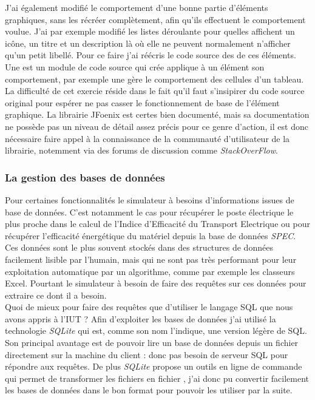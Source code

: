 J'ai également modifié le comportement d'une bonne partie d'éléments graphiques, sans les récréer complètement, afin qu'ils effectuent le comportement voulue. J'ai par exemple modifié les listes déroulante pour quelles affichent un icône, un titre et un description là où elle ne peuvent normalement n'afficher qu'un petit libellé. Pour ce faire j'ai réécris le code source des  de ces éléments. Une  est un module de code source qui crée applique à un élément son comportement, par exemple une  gère le comportement des cellules d'un tableau. La difficulté de cet exercie réside dans le fait qu'il faut s'insipirer du code source original pour espérer ne pas casser le fonctionnement de base de l'élément graphique. La librairie JFoenix est certes bien documenté, mais sa documentation ne possède pas un niveau de détail assez précis pour ce genre d'action, il est donc nécessaire faire appel à la connaissance de la communauté d'utilisateur de la librairie, notemment via des forums de discussion comme \emph{StackOverFlow}.

\subsubsection{La gestion des bases de données}
Pour certaines fonctionnalités le simulateur à besoins d'informations issues de base de données. C'est notamment le cas pour récupérer le poste électrique le plus proche dans le calcul de l'Indice d'Efficacité du Transport Electrique ou pour récupérer l'efficacité énergétique du matériel depuis la base de données \emph{SPEC}.\\
Ces données sont le plus souvent stockés dans des structures de données facilement lisible par l'humain, mais qui ne sont pas très performant pour leur exploitation automatique par un algorithme, comme par exemple les classeurs Excel. Pourtant le simulateur à besoin de faire des requêtes sur ces données pour extraire ce dont il a besoin.\\

Quoi de mieux pour faire des requêtes que d'utiliser le langage SQL que nous avons appris à l'IUT ? Afin d'exploiter les bases de données j'ai utilisé la technologie \emph{SQLite} qui est, comme son nom l'indique, une version légère de SQL. Son principal avantage est de pouvoir lire un base de données depuis un fichier directement sur la machine du client : donc pas besoin de serveur SQL pour répondre aux requêtes. De plus \emph{SQLite} propose un outils en ligne de commande qui permet de transformer les fichiers  en fichier , j'ai donc pu convertir facilement les bases de données dans le bon format pour pouvoir les utiliser par la suite.

